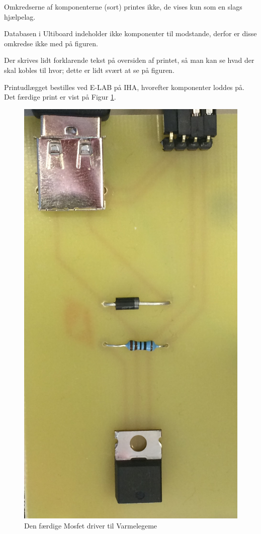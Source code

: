 Omkredserne af komponenterne (sort) printes ikke, de vises kun som en slags hjælpelag. 

Databasen i Ultiboard indeholder ikke komponenter til modstande, derfor er disse omkredse ikke med på figuren. 

Der skrives lidt forklarende tekst på oversiden af printet, så man kan se hvad der skal kobles til hvor; dette er lidt svært at se på figuren.
\newline

Printudlægget bestilles ved E-LAB på IHA, hvorefter komponenter loddes på.
Det færdige print er vist på Figur \ref{fig:varmelegeme_print}.

\clearpage

\begin{figure}[h]
\centering 
\includegraphics[width={\textwidth-5cm}, trim=0 0 0 0, clip=true] {../fig/VarmePrintBillede} 
\caption{Den færdige Mosfet driver til Varmelegeme}
\label{fig:varmelegeme_print}
\end{figure}

